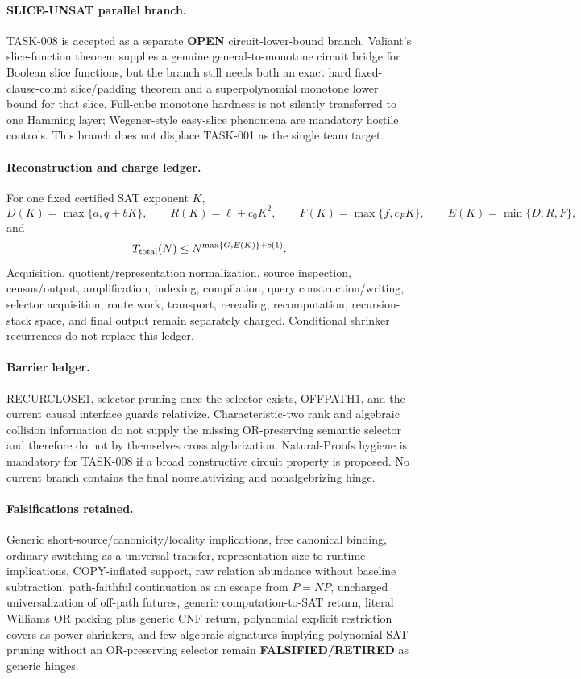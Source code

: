 \documentclass[11pt]{article}
\begin{document}
\paragraph{SLICE-UNSAT parallel branch.}
TASK-008 is accepted as a separate \textbf{OPEN} circuit-lower-bound branch. Valiant's
slice-function theorem supplies a genuine general-to-monotone circuit bridge for Boolean slice
functions, but the branch still needs both an exact hard fixed-clause-count slice/padding theorem
and a superpolynomial monotone lower bound for that slice. Full-cube monotone hardness is not
silently transferred to one Hamming layer; Wegener-style easy-slice phenomena are mandatory
hostile controls. This branch does not displace TASK-001 as the single team target.

\paragraph{Reconstruction and charge ledger.}
For one fixed certified SAT exponent \(K\),
\[
D(K)=\max\{a,q+bK\},\qquad
R(K)=\ell+c_0K^2,\qquad
F(K)=\max\{f,c_FK\},\qquad
E(K)=\min\{D,R,F\},
\]
and
\[
T_{\rm total}(N)\le N^{\max\{G,E(K)\}+o(1)}.
\]
Acquisition, quotient/representation normalization, source inspection, census/output,
amplification, indexing, compilation, query construction/writing, selector acquisition,
route work, transport, rereading, recomputation, recursion-stack space, and final output
remain separately charged. Conditional shrinker recurrences do not replace this ledger.

\paragraph{Barrier ledger.}
RECURCLOSE1, selector pruning once the selector exists, OFFPATH1, and the current causal
interface guards relativize. Characteristic-two rank and algebraic collision information do not
supply the missing OR-preserving semantic selector and therefore do not by themselves cross
algebrization. Natural-Proofs hygiene is mandatory for TASK-008 if a broad constructive circuit
property is proposed. No current branch contains the final nonrelativizing and nonalgebrizing hinge.

\paragraph{Falsifications retained.}
Generic short-source/canonicity/locality implications, free canonical binding, ordinary switching
as a universal transfer, representation-size-to-runtime implications, COPY-inflated support,
raw relation abundance without baseline subtraction, path-faithful continuation as an escape
from \(P=NP\), uncharged universalization of off-path futures, generic computation-to-SAT return,
literal Williams OR packing plus generic CNF return, polynomial explicit restriction covers as
power shrinkers, and few algebraic signatures implying polynomial SAT pruning without an
OR-preserving selector remain \textbf{FALSIFIED/RETIRED} as generic hinges.
\end{document}
